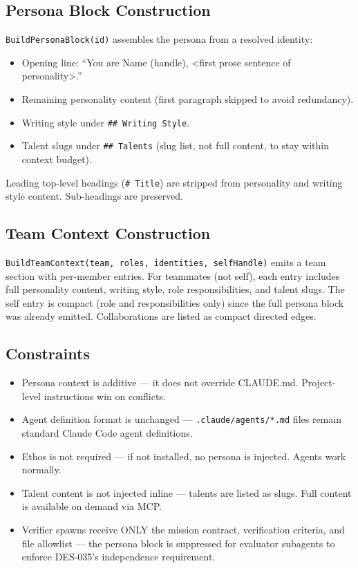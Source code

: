 \documentclass[a4paper,10pt]{article}
\newcommand{\fpath}[1]{\texttt{#1}}
\begin{document}
\subsection{Persona Block Construction}

\texttt{BuildPersonaBlock(id)} assembles the persona from a resolved
identity:

\begin{itemize}
  \item Opening line: ``You are Name (handle), <first prose sentence
    of personality>.''
  \item Remaining personality content (first paragraph skipped to
    avoid redundancy).
  \item Writing style under \texttt{\#\# Writing Style}.
  \item Talent slugs under \texttt{\#\# Talents} (slug list, not
    full content, to stay within context budget).
\end{itemize}

Leading top-level headings (\texttt{\# Title}) are stripped from
personality and writing style content.  Sub-headings are preserved.

\subsection{Team Context Construction}

\texttt{BuildTeamContext(team, roles, identities, selfHandle)} emits
a team section with per-member entries.  For teammates (not self),
each entry includes full personality content, writing style, role
responsibilities, and talent slugs.  The self entry is compact (role
and responsibilities only) since the full persona block was already
emitted.  Collaborations are listed as compact directed edges.

\subsection{Constraints}

\begin{itemize}
  \item Persona context is additive --- it does not override CLAUDE.md.
    Project-level instructions win on conflicts.
  \item Agent definition format is unchanged --- \fpath{.claude/agents/*.md}
    files remain standard Claude Code agent definitions.
  \item Ethos is not required --- if not installed, no persona is injected.
    Agents work normally.
  \item Talent content is not injected inline --- talents are listed as
    slugs.  Full content is available on demand via MCP.
  \item Verifier spawns receive ONLY the mission contract,
    verification criteria, and file allowlist --- the persona block
    is suppressed for evaluator subagents to enforce DES-035's
    independence requirement.
\end{itemize}
\end{document}

